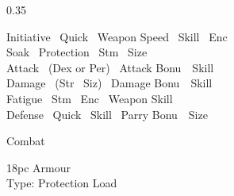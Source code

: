 \begin{boxpage}{\cttotals}{0.35\linewidth}
\begin{flushleft}
  {\smalltight
   Initiative \e\ Quick \p\ Weapon Speed \p\ Skill \p\ Enc\\
   Soak \e\ Protection \p\ Stm \p\ Size\\
   Attack \e\ (Dex or Per) \p\ Attack Bonu\s\ \p\ Skill\\
   Damage \e\ (Str \p\ Siz) \p\ Damage Bonu\s\ \p\ Skill\\
   Fatigue \e\ Stm \p\ Enc \p\ Weapon Skill\\
   Defense \e\ Quick \p\ Skill \p\ Parry Bonu\s\ \m\ Size\\
  }
\end{flushleft}
\end{boxpage}

\begin{boxpage}{\combatbox}{\linewidth}
{\minorheading Combat}\\[0.5ex]
\hfil\usebox{\ctstats}\hfil\usebox{\cttotals}\hfil
\end{boxpage}


\begin{boxpage}{\armourbox}{18pc}
  {\minorheading Armour}\\[0.5ex]
  Type: \handfamily\ArmourType\fillRule\break
  \printfamily Protection \smallbox[\handfamily\Protection]
  \hspace{0pt plus1filll} Load \smallbox[\handfamily\ArmourLoad]\\[1ex]
\end{boxpage}


